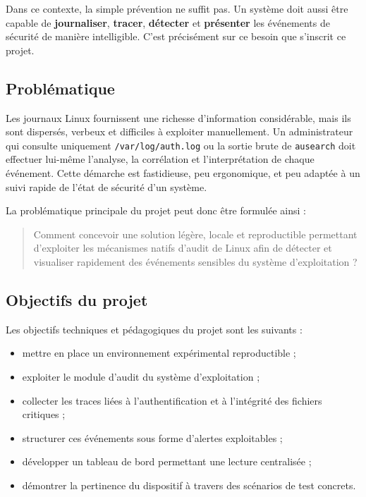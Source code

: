 \documentclass[12pt,a4paper]{article}
\begin{document}
Dans ce contexte, la simple prévention ne suffit pas. Un système doit aussi être capable de \textbf{journaliser}, \textbf{tracer}, \textbf{détecter} et \textbf{présenter} les événements de sécurité de manière intelligible. C’est précisément sur ce besoin que s’inscrit ce projet.

\subsection{Problématique}

Les journaux Linux fournissent une richesse d’information considérable, mais ils sont dispersés, verbeux et difficiles à exploiter manuellement. Un administrateur qui consulte uniquement \texttt{/var/log/auth.log} ou la sortie brute de \texttt{ausearch} doit effectuer lui-même l’analyse, la corrélation et l’interprétation de chaque événement. Cette démarche est fastidieuse, peu ergonomique, et peu adaptée à un suivi rapide de l’état de sécurité d’un système.

La problématique principale du projet peut donc être formulée ainsi :

\begin{quote}
Comment concevoir une solution légère, locale et reproductible permettant d’exploiter les mécanismes natifs d’audit de Linux afin de détecter et visualiser rapidement des événements sensibles du système d’exploitation ?
\end{quote}

\subsection{Objectifs du projet}

Les objectifs techniques et pédagogiques du projet sont les suivants :
\begin{itemize}
    \item mettre en place un environnement expérimental reproductible ;
    \item exploiter le module d’audit du système d’exploitation ;
    \item collecter les traces liées à l’authentification et à l’intégrité des fichiers critiques ;
    \item structurer ces événements sous forme d’alertes exploitables ;
    \item développer un tableau de bord permettant une lecture centralisée ;
    \item démontrer la pertinence du dispositif à travers des scénarios de test concrets.
\end{itemize}
\end{document}
